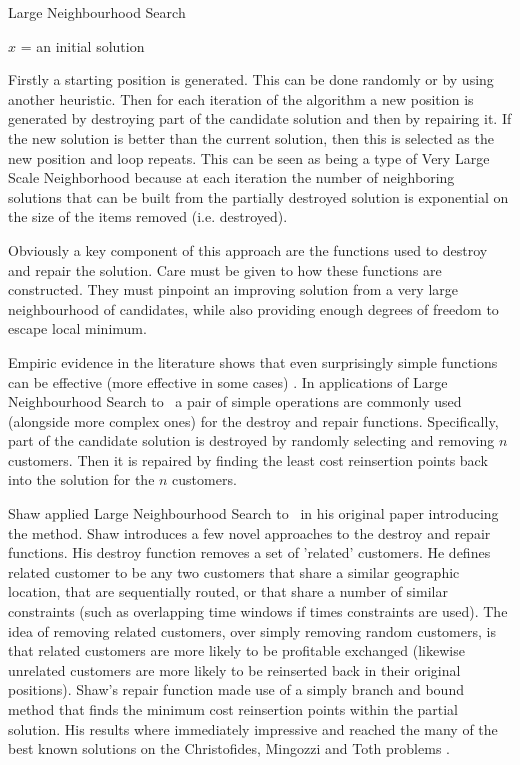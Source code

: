 \begin{algorithm}[H]
   \caption{Large Neighbourhood Search}
   $x$ = an initial solution\\
\end{algorithm}

Firstly a starting position is generated. This can be done randomly or by using another heuristic. Then for each iteration of the algorithm a new position is generated by destroying part of the candidate solution and then by repairing it. If the new solution is better than the current solution, then this is selected as the new position and loop repeats. This can be seen as being a type of Very Large Scale Neighborhood because at each iteration the number of neighboring solutions that can be built from the partially destroyed solution is exponential on the size of the items removed (i.e. destroyed).

Obviously a key component of this approach are the functions used to destroy and repair the solution. Care must be given to how these functions are constructed. They must pinpoint an improving solution from a very large neighbourhood of candidates, while also providing enough degrees of freedom to escape local minimum.

Empiric evidence in the literature shows that even surprisingly simple functions can be effective (more effective in some cases) \cite{Shaw:1998}\cite{Ropke:2005}. In applications of Large Neighbourhood Search to \VRP\ a pair of simple operations are commonly used (alongside more complex ones) for the destroy and repair functions. Specifically, part of the candidate solution is destroyed by randomly selecting and removing $n$ customers. Then it is repaired by finding the least cost reinsertion points back into the solution for the $n$ customers.

Shaw applied Large Neighbourhood Search to \VRP\ in his original paper introducing the method\cite{Shaw:1998}. Shaw introduces a few novel approaches to the destroy and repair functions. His destroy function removes a set of 'related' customers. He defines related customer to be any two customers that share a similar geographic location, that are sequentially routed, or that share a number of similar constraints (such as overlapping time windows if times constraints are used). The idea of removing related customers, over simply removing random customers, is that related customers are more likely to be profitable exchanged (likewise unrelated customers are more likely to be reinserted back in their original positions). Shaw's repair function made use of a simply branch and bound method that finds the minimum cost reinsertion points within the partial solution. His results where immediately impressive and reached the many of the best known solutions on the Christofides, Mingozzi and Toth problems \cite{CMT:1981}.

